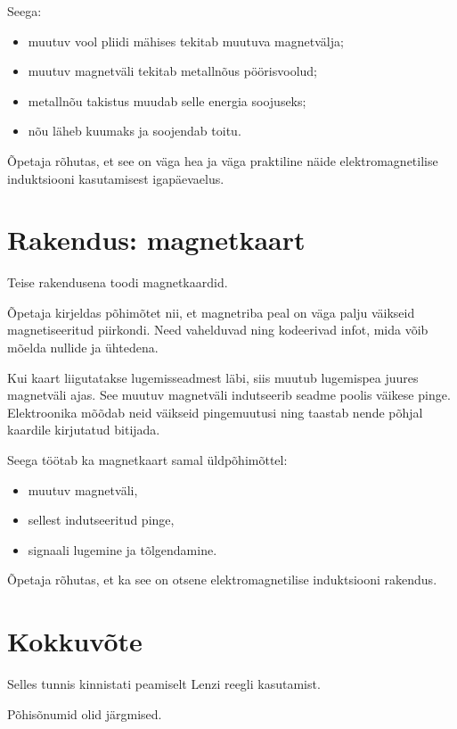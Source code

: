 \documentclass[a4paper,11pt]{article}
\begin{document}
Seega:

\begin{itemize}
    \item muutuv vool pliidi mähises tekitab muutuva magnetvälja;
    \item muutuv magnetväli tekitab metallnõus pöörisvoolud;
    \item metallnõu takistus muudab selle energia soojuseks;
    \item nõu läheb kuumaks ja soojendab toitu.
\end{itemize}

Õpetaja rõhutas, et see on väga hea ja väga praktiline näide elektromagnetilise induktsiooni kasutamisest igapäevaelus.

\section{Rakendus: magnetkaart}

Teise rakendusena toodi magnetkaardid.

Õpetaja kirjeldas põhimõtet nii, et magnetriba peal on väga palju väikseid magnetiseeritud piirkondi. Need vahelduvad ning kodeerivad infot, mida võib mõelda nullide ja ühtedena.

Kui kaart liigutatakse lugemisseadmest läbi, siis muutub lugemispea juures magnetväli ajas. See muutuv magnetväli indutseerib seadme poolis väikese pinge. Elektroonika mõõdab neid väikseid pingemuutusi ning taastab nende põhjal kaardile kirjutatud bitijada.

Seega töötab ka magnetkaart samal üldpõhimõttel:

\begin{itemize}
    \item muutuv magnetväli,
    \item sellest indutseeritud pinge,
    \item signaali lugemine ja tõlgendamine.
\end{itemize}

Õpetaja rõhutas, et ka see on otsene elektromagnetilise induktsiooni rakendus.

\section{Kokkuvõte}

Selles tunnis kinnistati peamiselt Lenzi reegli kasutamist.

Põhisõnumid olid järgmised.
\end{document}
